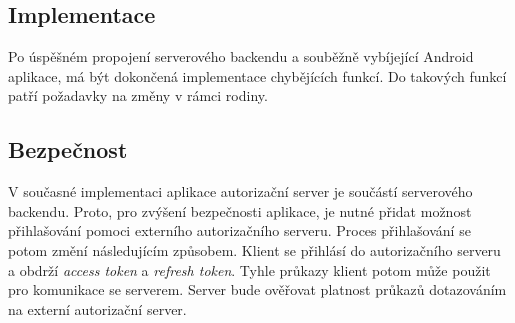     \subsection{Implementace}
        Po úspěšném propojení serverového backendu a souběžně vybíjející Android aplikace, má být dokončená implementace chybějících funkcí. Do takových funkcí patří požadavky na změny v rámci rodiny. 
        
    \subsection{Bezpečnost}
        V současné implementaci aplikace autorizační server je součástí serverového backendu. Proto, pro zvýšení bezpečnosti aplikace, je nutné přidat možnost přihlašování pomoci externího autorizačního serveru. Proces přihlašování se potom změní následujícím způsobem. Klient se přihlásí do autorizačního serveru a obdrží \textit{access token} a \textit{refresh token}. 
        Tyhle průkazy klient potom může použit pro komunikace se serverem. Server bude ověřovat platnost průkazů dotazováním na externí autorizační server.
